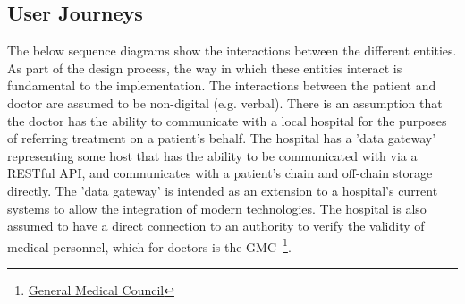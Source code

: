 \subsection{User Journeys}

The below sequence diagrams show the interactions between the different entities. As part of the design process, the way in which these entities interact is fundamental to the implementation. The interactions between the patient and doctor are assumed to be non-digital (e.g. verbal). There is an assumption that the doctor has the ability to communicate with a local hospital for the purposes of referring treatment on a patient's behalf. The hospital has a 'data gateway' representing some host that has the ability to be communicated with via a RESTful API, and communicates with a patient's chain and off-chain storage directly. The 'data gateway' is intended as an extension to a hospital's current systems to allow the integration of modern technologies. The hospital is also assumed to have a direct connection to an authority to verify the validity of medical personnel, which for doctors is the GMC~\footnote{\href{http://www.gmc-uk.org/}{General Medical Council}}.





